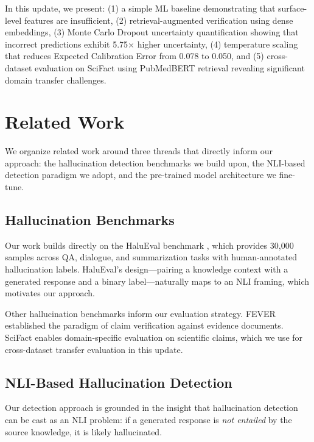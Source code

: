 \documentclass[11pt]{article}
\begin{document}
In this update, we present: (1) a simple ML baseline demonstrating that surface-level features are insufficient, (2) retrieval-augmented verification using dense embeddings, (3) Monte Carlo Dropout uncertainty quantification showing that incorrect predictions exhibit 5.75$\times$ higher uncertainty, (4) temperature scaling that reduces Expected Calibration Error from 0.078 to 0.050, and (5) cross-dataset evaluation on SciFact using PubMedBERT retrieval revealing significant domain transfer challenges.

\section{Related Work}

We organize related work around three threads that directly inform our approach: the hallucination detection benchmarks we build upon, the NLI-based detection paradigm we adopt, and the pre-trained model architecture we fine-tune.

\subsection{Hallucination Benchmarks}

Our work builds directly on the HaluEval benchmark \cite{li2023halueval}, which provides 30,000 samples across QA, dialogue, and summarization tasks with human-annotated hallucination labels. HaluEval's design---pairing a knowledge context with a generated response and a binary label---naturally maps to an NLI framing, which motivates our approach.

Other hallucination benchmarks inform our evaluation strategy. FEVER \cite{thorne2018fever} established the paradigm of claim verification against evidence documents. SciFact \cite{wadden2020fact} enables domain-specific evaluation on scientific claims, which we use for cross-dataset transfer evaluation in this update.

\subsection{NLI-Based Hallucination Detection}

Our detection approach is grounded in the insight that hallucination detection can be cast as an NLI problem: if a generated response is \textit{not entailed} by the source knowledge, it is likely hallucinated.
\end{document}
